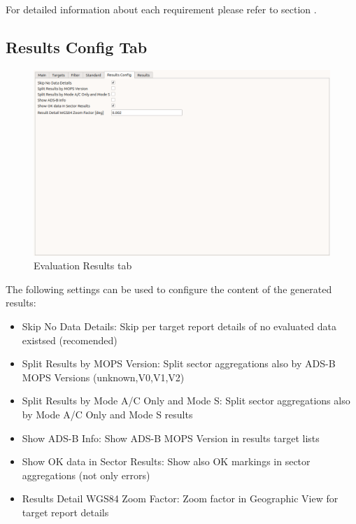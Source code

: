 For detailed information about each requirement please refer to section .

\subsection{Results Config Tab}

\begin{figure}[H]
  \hspace*{-2cm}
    \includegraphics[width=18cm,frame]{figures/eval_results_config.png}
  \caption{Evaluation Results tab}
\end{figure}

The following settings can be used to configure the content of the generated results:
\begin{itemize}  
\item Skip No Data Details: Skip per target report details of no evaluated data existsed (recomended)
\item Split Results by MOPS Version: Split sector aggregations also by ADS-B MOPS Versions (unknown,V0,V1,V2)
\item Split Results by Mode A/C Only and Mode S: Split sector aggregations also by Mode A/C Only and Mode S results
\item Show ADS-B Info: Show ADS-B MOPS Version in results target lists
\item Show OK data in Sector Results: Show also OK markings in sector aggregations (not only errors)
\item Results Detail WGS84 Zoom Factor: Zoom factor in Geographic View for target report details
\end{itemize}
\ \\

